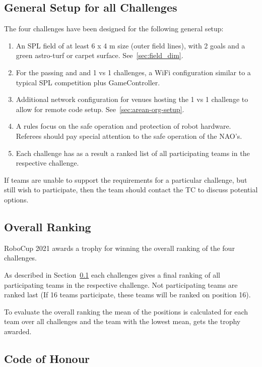 \subsection{General Setup for all Challenges}
\label{sec:GeneralSetupChallenges}

The four challenges have been designed for the following general setup:
\begin{enumerate}
    \item An SPL field of at least 6 x 4 m size (outer field lines), with 2 goals and a green astro-turf or carpet surface. See~\ref{sec:field_dim}.
    \item For the passing and and 1 vs 1 challenges, a WiFi configuration similar to a typical SPL competition plus GameController. 
    \item Additional network configuration for venues hosting the 1 vs 1 challenge to allow for remote code setup. See~\ref{sec:arean-org-setup}.
    \item A rules focus on the safe operation and protection of robot hardware. Referees should pay special attention to the safe operation of the NAO's.
    \item Each challenge has as a result a ranked list of all participating teams in the respective challenge.
\end{enumerate}

If teams are unable to support the requirements for a particular challenge, but still wish to participate, then the team should contact the TC to discuss potential options.

\subsection{Overall Ranking}
RoboCup 2021 awards a trophy for winning the overall ranking of the four challenges.

As described in Section~\ref{sec:GeneralSetupChallenges} each challenges gives a final ranking of all participating teams in the respective challenge. Not participating teams are ranked last (If 16 teams participate, these teams will be ranked on position 16).

To evaluate the overall ranking the mean of the positions is calculated for each team over all challenges and the team with the lowest mean, gets the trophy awarded.

\subsection{Code of Honour}

